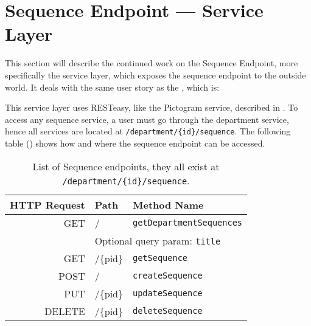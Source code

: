 \section{Sequence Endpoint --- Service Layer}
This section will describe the continued work on the Sequence Endpoint, more specifically the service layer, which exposes the sequence endpoint to the outside world.
It deals with the same user story as the , which is:
\begin{center}
\end{center}

\bigskip
This service layer uses RESTeasy, like the Pictogram service, described in .
To access any sequence service, a user must go through the department service, hence all services are located at \texttt{/department/\{id\}/sequence}.
The following table () shows how and where the sequence endpoint can be accessed.

\begin{table}[]
\footnotesize
\centering
\begin{tabular}{rll}
HTTP Request    & Path          & Method Name                   \\
\midrule
GET             &/              & \texttt{getDepartmentSequences}     \\
&\multicolumn{2}{l}{Optional query param: \texttt{title}}\\
GET             &/\{pid\}       & \texttt{getSequence}         \\
\tblgrpsep
POST            &/              & \texttt{createSequence}      \\
\tblgrpsep
PUT             &/\{pid\}       & \texttt{updateSequence}      \\
\tblgrpsep
DELETE          &/\{pid\}	    & \texttt{deleteSequence}	    \\
\end{tabular}
\caption{List of Sequence endpoints, they all exist at \texttt{/department/\{id\}/sequence}.}\label{tbl:sequence_eps}
\end{table}

